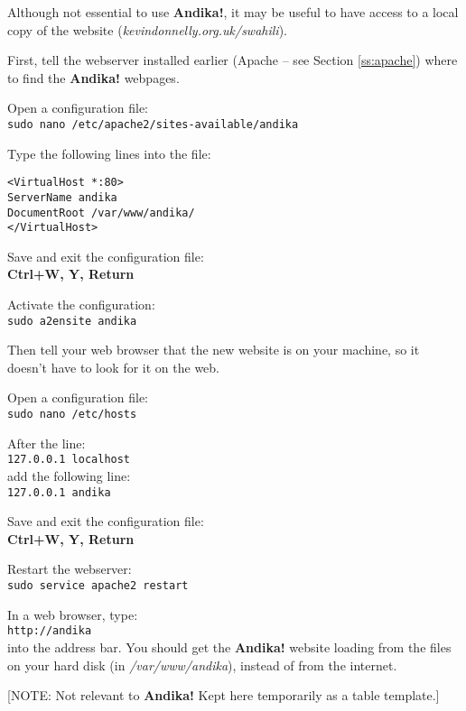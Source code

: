 \documentclass[a4paper,10pt]{article}
\begin{document}
Although not essential to use \textbf{Andika!}, it may be useful to have access to a local copy of the website (\textit{kevindonnelly.org.uk/swahili}).  

First, tell the webserver installed earlier (Apache -- see Section \ref{ss:apache}) where to find the\textbf{ Andika!} webpages.

Open a configuration file:\\
\verb|sudo nano /etc/apache2/sites-available/andika|

Type the following lines into the file:\\
\vspace{-0.5cm}  %
\begin{verbatim}
<VirtualHost *:80>
ServerName andika
DocumentRoot /var/www/andika/
</VirtualHost>
\end{verbatim}

Save and exit the configuration file:\\
\textbf{Ctrl+W, Y, Return}

Activate the configuration:\\
\verb|sudo a2ensite andika|

Then tell your web browser that the new website is on your machine, so it doesn't have to look for it on the web.

Open a configuration file:\\
\verb|sudo nano /etc/hosts|

After the line:\\
\verb|127.0.0.1	localhost|\\
add the following line:\\
\verb|127.0.0.1	andika|

Save and exit the configuration file:\\
\textbf{Ctrl+W, Y, Return}

Restart the webserver:\\
\verb|sudo service apache2 restart|

In a web browser, type:\\
\verb|http://andika|\\
into the address bar.  You should get the \textbf{Andika!} website loading from the files on your hard disk (in \textit{/var/www/andika}), instead of from the internet.



\newpage


[NOTE: Not relevant to \textbf{Andika!} Kept here temporarily as a table template.]
\end{document}
